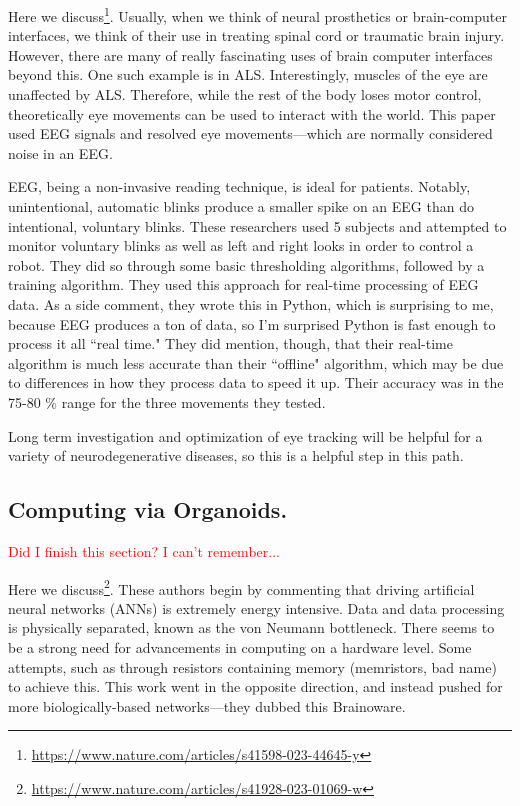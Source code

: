 Here we discuss\footnote{\url{https://www.nature.com/articles/s41598-023-44645-y}}. Usually, when we think of neural prosthetics or brain-computer interfaces, we think of their use in treating spinal cord or traumatic brain injury. However, there are many of really fascinating uses of brain computer interfaces beyond this. One such example is in ALS. Interestingly, muscles of the eye are unaffected by ALS. Therefore, while the rest of the body loses motor control, theoretically eye movements can be used to interact with the world. This paper used EEG signals and resolved eye movements---which are normally considered noise in an EEG.\newline

EEG, being a non-invasive reading technique, is ideal for patients. Notably, unintentional, automatic blinks produce a smaller spike on an EEG than do intentional, voluntary blinks. These researchers used 5 subjects and attempted to monitor voluntary blinks as well as left and right looks in order to control a robot. They did so through some basic thresholding algorithms, followed by a training algorithm. They used this approach for real-time processing of EEG data. As a side comment, they wrote this in Python, which is surprising to me, because EEG produces a ton of data, so I'm surprised Python is fast enough to process it all ``real time." They did mention, though, that their real-time algorithm is much less accurate than their ``offline" algorithm, which may be due to differences in how they process data to speed it up. Their accuracy was in the 75-80 \% range for the three movements they tested.\newline

Long term investigation and optimization of eye tracking will be helpful for a variety of neurodegenerative diseases, so this is a helpful step in this path. 

\subsection{Computing via Organoids.}

\textcolor{red}{Did I finish this section? I can't remember...}

Here we discuss\footnote{\url{https://www.nature.com/articles/s41928-023-01069-w}}. These authors begin by commenting that driving artificial neural networks (ANNs) is extremely energy intensive. Data and data processing is physically separated, known as the von Neumann bottleneck. There seems to be a strong need for advancements in computing on a hardware level. Some attempts, such as through resistors containing memory (memristors, bad name) to achieve this. This work went in the opposite direction, and instead pushed for more biologically-based networks---they dubbed this Brainoware.\newline

